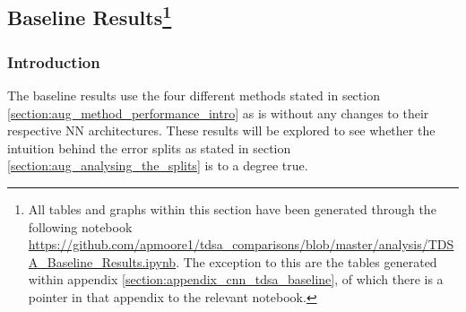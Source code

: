
\FloatBarrier
\subsection[Baseline Results]{Baseline Results\footnote{All tables and graphs within this section have been generated through the following notebook \url{https://github.com/apmoore1/tdsa_comparisons/blob/master/analysis/TDSA_Baseline_Results.ipynb}. The exception to this are the tables generated within appendix \ref{section:appendix_cnn_tdsa_baseline}, of which there is a pointer in that appendix to the relevant notebook.}}
\label{section:aug_baseline}
\subsubsection{Introduction}
The baseline results use the four different methods stated in section \ref{section:aug_method_performance_intro} as is without any changes to their respective NN architectures. These results will be explored to see whether the intuition behind the error splits as stated in section \ref{section:aug_analysing_the_splits} is to a degree true. 

